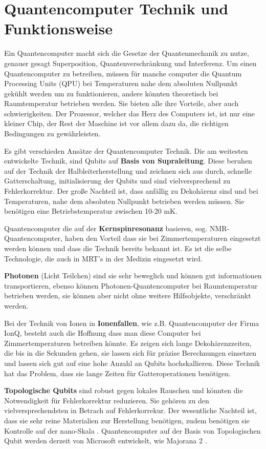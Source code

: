 \section{Quantencomputer Technik und Funktionsweise}
Ein Quantencomputer macht sich die Gesetze der Quantenmechanik zu nutze, genauer gesagt Superposition, Quantenverschränkung und Interferenz.
Um einen Quantencomputer zu betreiben, müssen für manche computer die Quantum Processing Units (QPU) bei Temperaturen nahe dem absoluten Nullpunkt gekühlt werden um zu funktionieren, andere könnten theoretisch bei Raumtemperatur betrieben werden.
Sie bieten alle ihre Vorteile, aber auch schwierigkeiten.
Der Prozessor, welcher das Herz des Computers ist, ist nur eine kleiner Chip, der Rest der Maschine ist vor allem dazu da, die richtigen Bedingungen zu gewährleisten.

Es gibt verschieden Ansätze der Quantencomputer Technik.
Die am weitesten entwickelte Technik, sind Qubits auf \textbf{Basis von Supraleitung}.
Diese beruhen auf der Technik der Halbleiterherstellung und zeichnen sich aus durch, schnelle Gatterschaltung, initialisierung der Qubits und sind vielversprechend zu Fehlerkorrektur.
Der große Nachteil ist, dass anfällig zu Dekohärenz sind und bei Temperaturen, nahe dem absoluten Nullpunkt betrieben werden müssen.
Sie benötigen eine Betriebstemperatur zwischen 10-20 mK.

Quantencomputer die auf der \textbf{Kernspinresonanz} basieren, sog. NMR-Quantencomputer, haben den Vorteil dass sie bei Zimmertemperaturen eingesetzt werden können und dass die Technik bereits bekannt ist.
Es ist die selbe Technologie, die auch in MRT's in der Medizin eingesetzt wird.

\textbf{Photonen} (Licht Teilchen) sind sie sehr beweglich und können gut informationen transportieren, ebenso können Photonen-Quantencomputer bei Raumtemperatur betrieben werden, sie können aber nicht ohne weitere Hilfsobjekte, verschränkt werden.

Bei der Technik von Ionen in \textbf{Ionenfallen}, wie z.B. Quantencomputer der Firma IonQ, besteht auch die Hoffnung dass man diese Computer bei Zimmertemperaturen betreiben könnte.
Es zeigen sich lange Dekohärenzzeiten, die bis in die Sekunden gehen, sie lassen sich für präzise Berechnungen einsetzen und lassen sich gut auf eine hohe Anzahl an Qubits hochskallieren.
Diese Technik hat das Problem, dass sie lange Zeiten für Gatteroperationen benötigen.

\textbf{Topologische Qubits} sind robust gegen lokales Rauschen und könnten die Notwendigkeit für Fehlerkorrektur reduzieren.
Sie gehören zu den vielversprechendsten in Betrach auf Fehlerkorrekur.
Der wesentliche Nachteil ist, dass sie sehr reine Materialien zur Herstellung benötigen, zudem benötigen sie Kontrolle auf der nano-Skala \cite{pospiechQuantencomputerCoGrundideen2021,molfettaQuantumComputingNew2026}.
Quantencomputer auf der Basis von Topologischen Qubit werden derzeit von Microsoft entwickelt, wie Majorana 2 \cite{bolgarIntroducingMajorana2}.


